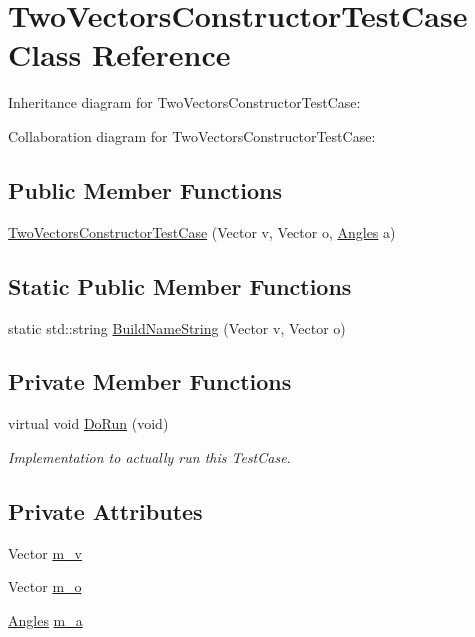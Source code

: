 \hypertarget{classTwoVectorsConstructorTestCase}{}\section{Two\+Vectors\+Constructor\+Test\+Case Class Reference}
\label{classTwoVectorsConstructorTestCase}


Inheritance diagram for Two\+Vectors\+Constructor\+Test\+Case\+:


Collaboration diagram for Two\+Vectors\+Constructor\+Test\+Case\+:
\subsection*{Public Member Functions}
\begin{DoxyCompactItemize}
\item 
\hyperlink{classTwoVectorsConstructorTestCase_a001e6a1b82d3d9d66f8e56976e92e6be}{Two\+Vectors\+Constructor\+Test\+Case} (Vector v, Vector o, \hyperlink{structns3_1_1Angles}{Angles} a)
\end{DoxyCompactItemize}
\subsection*{Static Public Member Functions}
\begin{DoxyCompactItemize}
\item 
static std\+::string \hyperlink{classTwoVectorsConstructorTestCase_af3c0a56c0c0185cf66058dd49409f198}{Build\+Name\+String} (Vector v, Vector o)
\end{DoxyCompactItemize}
\subsection*{Private Member Functions}
\begin{DoxyCompactItemize}
\item 
virtual void \hyperlink{classTwoVectorsConstructorTestCase_abc0083e0989d9b804edb686949093b7a}{Do\+Run} (void)
\begin{DoxyCompactList}\small\item\em Implementation to actually run this Test\+Case. \end{DoxyCompactList}\end{DoxyCompactItemize}
\subsection*{Private Attributes}
\begin{DoxyCompactItemize}
\item 
Vector \hyperlink{classTwoVectorsConstructorTestCase_a18c0da207aedfe832db0d738f29754f4}{m\+\_\+v}
\item 
Vector \hyperlink{classTwoVectorsConstructorTestCase_aade521aee554794cab2e763937576fa0}{m\+\_\+o}
\item 
\hyperlink{structns3_1_1Angles}{Angles} \hyperlink{classTwoVectorsConstructorTestCase_a937a72d8e675e39c0ba1c3fdc9350fca}{m\+\_\+a}
\end{DoxyCompactItemize}
